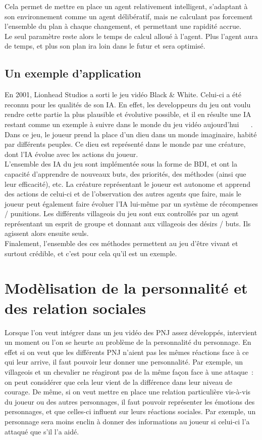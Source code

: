 \documentclass[asi]{picINSAIA}
\begin{document}
Cela permet de mettre en place un agent relativement intelligent, s'adaptant à son environnement comme un agent délibératif, mais ne calculant pas forcement l'ensemble du plan à chaque changement, et permettant une rapidité accrue.\\
Le seul paramètre reste alors le temps de calcul alloué à l'agent. Plus l'agent aura de temps, et plus son plan ira loin dans le futur et sera optimisé.

\section{Un exemple d'application}
En 2001, Lionhead Studios a sorti le jeu vidéo Black \& White. Celui-ci a été reconnu pour les qualités de son IA. En effet, les developpeurs du jeu ont voulu rendre cette partie la plus plausible et évolutive possible, et il en résulte une IA restant comme un exemple à suivre dans le monde du jeu vidéo aujourd'hui ~\cite{MindGames} ~\cite{CompGamesWithIntel}.\\
Dans ce jeu, le joueur prend la place d'un dieu dans un monde imaginaire, habité par différents peuples. Ce dieu est représenté dans le monde par une créature, dont l'IA évolue avec les actions du joueur.\\

L'ensemble des IA du jeu sont implémentée sous la forme de BDI, et ont la capacité d'apprendre de nouveaux buts, des priorités, des méthodes (ainsi que leur efficacité), etc. La créature représentant le joueur est autonome et apprend des actions de celui-ci et de l'observation des autres agents que faire, mais le joueur peut également faire évoluer l'IA lui-même par un système de récompenses / punitions. Les différents villageois du jeu sont eux controllés par un agent représentant un esprit de groupe et donnant aux villageois des désirs / buts. Ils agissent alors ensuite seuls.\\
Finalement, l'ensemble des ces méthodes permettent au jeu d'être vivant et surtout crédible, et c'est pour cela qu'il est un exemple.


\chapter{Modèlisation de la personnalité et des relation sociales}
Lorsque l'on veut intégrer dans un jeu vidéo des PNJ assez développés, intervient un moment ou l'on se heurte au problème de la personnalité du personnage. En effet si on veut que les différents PNJ n'aient pas les mêmes réactions face à ce qui leur arrive, il faut pouvoir leur donner une personnalité. Par exemple, un villageois et un chevalier ne réagiront pas de la même façon face à une attaque : on peut considérer que cela leur vient de la différence dans leur niveau de courage. De même, si on veut mettre en place une relation particulière vis-à-vis du joueur ou des autres personnages, il faut pouvoir représenter les émotions des personnages, et que celles-ci influent sur leurs réactions sociales. Par exemple, un personnage sera moins enclin à donner des informations au joueur si celui-ci l'a attaqué que s’il l'a aidé. 
\end{document}
